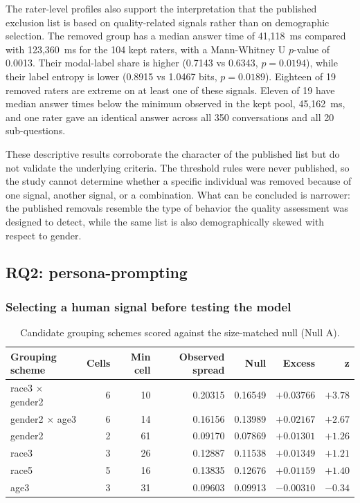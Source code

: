 \documentclass[11pt,a4paper]{article}
\begin{document}
The rater-level profiles also support the interpretation that the published exclusion list is
based on quality-related signals rather than on demographic selection. The removed group has a
median answer time of 41,118~ms compared with 123,360~ms for the 104 kept raters, with a
Mann-Whitney U $p$-value of 0.0013. Their modal-label share is higher (0.7143 vs 0.6343,
$p = 0.0194$), while their label entropy is lower (0.8915 vs 1.0467 bits, $p = 0.0189$). Eighteen
of 19 removed raters are extreme on at least one of these signals. Eleven of 19 have
median answer times below the minimum observed in the kept pool, 45,162~ms, and one rater gave an
identical answer across all 350 conversations and all 20 sub-questions.

These descriptive results corroborate the character of the published list but do not validate the
underlying criteria. The threshold rules were never published, so the study cannot determine whether a specific individual was removed because of one signal, another signal,
or a combination. What can be concluded is narrower: the published removals resemble the type of
behavior the quality assessment was designed to detect, while the same list is also
demographically skewed with respect to gender.

\subsection{RQ2: persona-prompting}

\subsubsection{Selecting a human signal before testing the model}
\label{sec:cells}

\begin{table}[htbp]
\centering
\caption{Candidate grouping schemes scored against the size-matched null (Null A).}
\label{tab:schemes}
\small\begin{tabular}{lrrrrrr}
\toprule
\textbf{Grouping scheme} & \textbf{Cells} & \textbf{Min cell} & \textbf{Observed spread} &
\textbf{Null} & \textbf{Excess} & \textbf{z} \\
\midrule
race3 $\times$ gender2 & 6 & 10 & 0.20315 & 0.16549 & $+0.03766$ & $+3.78$ \\
gender2 $\times$ age3 & 6 & 14 & 0.16156 & 0.13989 & $+0.02167$ & $+2.67$ \\
gender2 & 2 & 61 & 0.09170 & 0.07869 & $+0.01301$ & $+1.26$ \\
race3 & 3 & 26 & 0.12887 & 0.11538 & $+0.01349$ & $+1.21$ \\
race5 & 5 & 16 & 0.13835 & 0.12676 & $+0.01159$ & $+1.40$ \\
age3 & 3 & 31 & 0.09603 & 0.09913 & $-0.00310$ & $-0.34$ \\
\bottomrule
\end{tabular}

\end{table}
\end{document}
